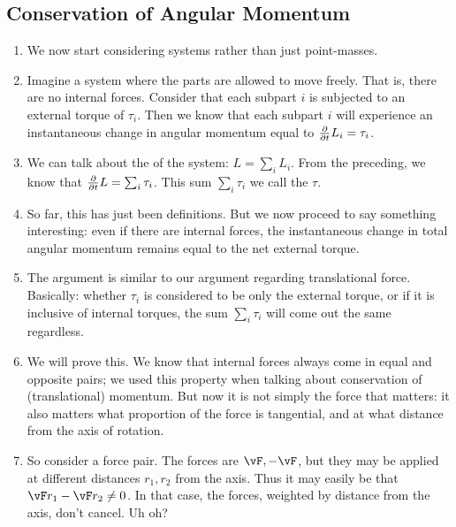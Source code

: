 \subsection{Conservation of Angular Momentum}

\begin{enumerate}
  \item We now start considering systems rather than just point-masses.

  \item Imagine a system where the parts are allowed to move freely.
  That is, there are no internal forces. Consider that each subpart $i$
  is subjected to an external torque of $\tau_i$. Then we know that each
  subpart $i$ will experience an instantaneous change in angular
  momentum equal to $\frac{\partial }{\partial t} L_i = \tau_i$.

  \item We can talk about the  of the
  system: $L = \sum_i L_i$. From the preceding, we know that
  $\frac{\partial }{\partial t} L = \sum_i \tau_i$. This sum $\sum_i \tau_i$ we call the
   $\tau$.

  \item So far, this has just been definitions. But we now proceed to
  say something interesting: even if there are internal forces, the
  instantaneous change in total angular momentum remains equal to the
  net external torque.

  \item The argument is similar to our argument regarding translational
  force. Basically: whether $\tau_i$ is considered to be only the
  external torque, or if it is inclusive of internal torques, the sum
  $\sum_i \tau_i$ will come out the same regardless.

  \item We will prove this. We know that internal forces always come in
  equal and opposite pairs; we used this property when talking about
  conservation of (translational) momentum. But now it is not simply the
  force that matters: it also matters what proportion of the force is
  tangential, and at what distance from the axis of rotation.

  \item So consider a force pair. The forces are $\vF, -\vF$, but they
  may be applied at different distances $r_1, r_2$ from the axis. Thus
  it may easily be that $\vF r_1 - \vF r_2 \ne 0$. In that case, the
  forces, weighted by distance from the axis, don't cancel. Uh oh?


\end{enumerate}
